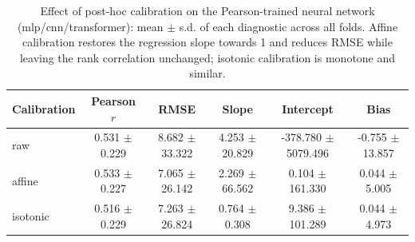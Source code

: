 \begin{table}[ht]
\caption{Effect of post-hoc calibration on the Pearson-trained neural network (mlp/cnn/transformer): mean $\pm$ s.d. of each diagnostic across all folds. Affine calibration restores the regression slope towards 1 and reduces RMSE while leaving the rank correlation unchanged; isotonic calibration is monotone and similar.}
\label{tab:S-calibration}
\begin{tabular}{lccccc}
\toprule
Calibration & Pearson $r$ & RMSE & Slope & Intercept & Bias \\
\midrule
raw & 0.531 $\pm$ 0.229 & 8.682 $\pm$ 33.322 & 4.253 $\pm$ 20.829 & -378.780 $\pm$ 5079.496 & -0.755 $\pm$ 13.857 \\
affine & 0.533 $\pm$ 0.227 & 7.065 $\pm$ 26.142 & 2.269 $\pm$ 66.562 & 0.104 $\pm$ 161.330 & 0.044 $\pm$ 5.005 \\
isotonic & 0.516 $\pm$ 0.229 & 7.263 $\pm$ 26.824 & 0.764 $\pm$ 0.308 & 9.386 $\pm$ 101.289 & 0.044 $\pm$ 4.973 \\
\bottomrule
\end{tabular}
\end{table}
